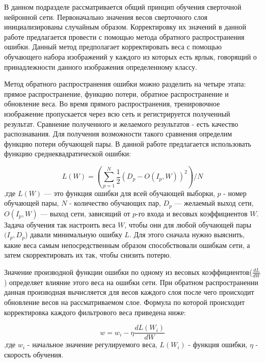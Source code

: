 \documentclass[14pt]{article}
\numberwithin{figure}{section}
\numberwithin{equation}{section}
\begin{document}

В данном подразделе рассматривается общий принцип обучения сверточной нейронной сети. Первоначально значения весов сверточного слоя инициализированы случайным образом. Корректировку их значений в данной работе предлагается провести с помощью метода обратного распространения ошибки\cite{LeCunBackProb}. Данный метод предполагает корректировать веса с помощью обучающего набора изображений у каждого из которых есть ярлык, говорящий о принадлежности данного изображения определенному классу.

Метод обратного распространения ошибки можно разделить на четыре этапа: прямое распространение, функцию потери, обратное распространение и обновление веса. Во время прямого распространения, тренировочное изображение пропускается через всю сеть и регистрируется полученный результат. Сравнение полученного и желаемого результатов - есть качество распознавания. Для получения возможности такого сравнения определим функцию потери обучающей пары. В данной работе предлагается использовать функцию среднеквадратической ошибки:

\begin{equation}
    L(W) = (\sum\limits_{p = 1}^{N} \frac{1}{2}(D_p - O(I_p, W))^2) / N
\end{equation}
,где $L(W)$ — это функция ошибки для всей обучающей выборки, $p$ - номер обучающей пары, $N$ - количество обучающих пар, $D_p$ — желаемый выход сети, $O(I_p,W)$ — выход сети, зависящий от $p$-го входа и весовых коэффициентов $W$. Задача обучения так настроить веса $W$, чтобы они для любой обучающей пары $(I_p,D_p$) давали минимальную ошибку $L$. Для этого сначала нужно выяснить, какие веса самым непосредственным образом способствовали ошибкам сети, а затем скорректировать их так, чтобы снизить потерю.

Значение производной функции ошибки по одному из весовых коэффициентов($\frac{dL}{dW}$) определяет влияние этого веса на ошибки сети. При обратном распространении данная производная вычисляется для весов каждого слоя после чего происходит обновление весов на рассматриваемом слое. Формула по которой происходит корректировка каждого фильтрового веса приведена ниже:

\begin{equation}
    w = w_i - \eta\frac{dL(W_i)}{dW}
\end{equation}
,где $w_i$ - начальное значение регулируемого веса, $L(W_i)$ - функция ошибки, $\eta$ - скорость обучения.
\end{document}
